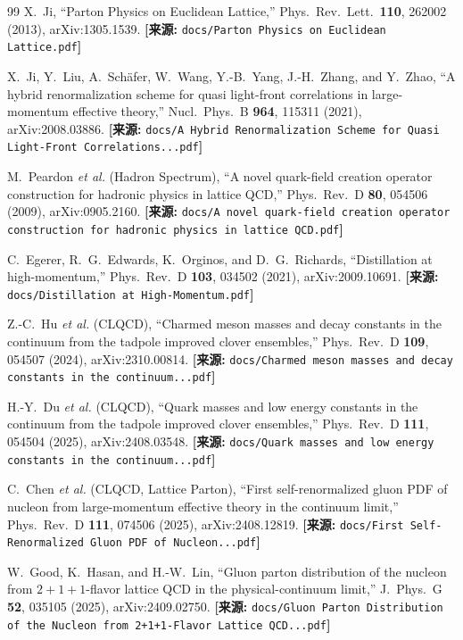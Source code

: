 \documentclass[12pt,a4paper]{ctexart}
\theoremstyle{definition}
\begin{document}
\begin{thebibliography}{99}
X.~Ji,
``Parton Physics on Euclidean Lattice,''
Phys.\ Rev.\ Lett.\ \textbf{110}, 262002 (2013), arXiv:1305.1539.
\quad\textbf{[来源:} \texttt{docs/Parton Physics on Euclidean Lattice.pdf}\textbf{]}

X.~Ji, Y.~Liu, A.~Sch\"afer, W.~Wang, Y.-B.~Yang, J.-H.~Zhang, and Y.~Zhao,
``A hybrid renormalization scheme for quasi light-front correlations in large-momentum effective theory,''
Nucl.\ Phys.\ B \textbf{964}, 115311 (2021), arXiv:2008.03886.
\quad\textbf{[来源:} \texttt{docs/A Hybrid Renormalization Scheme for Quasi Light-Front Correlations...pdf}\textbf{]}

M.~Peardon \textit{et al.} (Hadron Spectrum),
``A novel quark-field creation operator construction for hadronic physics in lattice QCD,''
Phys.\ Rev.\ D \textbf{80}, 054506 (2009), arXiv:0905.2160.
\quad\textbf{[来源:} \texttt{docs/A novel quark-field creation operator construction for hadronic physics in lattice QCD.pdf}\textbf{]}

C.~Egerer, R.~G.~Edwards, K.~Orginos, and D.~G.~Richards,
``Distillation at high-momentum,''
Phys.\ Rev.\ D \textbf{103}, 034502 (2021), arXiv:2009.10691.
\quad\textbf{[来源:} \texttt{docs/Distillation at High-Momentum.pdf}\textbf{]}

Z.-C.~Hu \textit{et al.} (CLQCD),
``Charmed meson masses and decay constants in the continuum from the tadpole improved clover ensembles,''
Phys.\ Rev.\ D \textbf{109}, 054507 (2024), arXiv:2310.00814.
\quad\textbf{[来源:} \texttt{docs/Charmed meson masses and decay constants in the continuum...pdf}\textbf{]}

H.-Y.~Du \textit{et al.} (CLQCD),
``Quark masses and low energy constants in the continuum from the tadpole improved clover ensembles,''
Phys.\ Rev.\ D \textbf{111}, 054504 (2025), arXiv:2408.03548.
\quad\textbf{[来源:} \texttt{docs/Quark masses and low energy constants in the continuum...pdf}\textbf{]}

C.~Chen \textit{et al.} (CLQCD, Lattice Parton),
``First self-renormalized gluon PDF of nucleon from large-momentum effective theory in the continuum limit,''
Phys.\ Rev.\ D \textbf{111}, 074506 (2025), arXiv:2408.12819.
\quad\textbf{[来源:} \texttt{docs/First Self-Renormalized Gluon PDF of Nucleon...pdf}\textbf{]}

W.~Good, K.~Hasan, and H.-W.~Lin,
``Gluon parton distribution of the nucleon from $2+1+1$-flavor lattice QCD in the physical-continuum limit,''
J.\ Phys.\ G \textbf{52}, 035105 (2025), arXiv:2409.02750.
\quad\textbf{[来源:} \texttt{docs/Gluon Parton Distribution of the Nucleon from 2+1+1-Flavor Lattice QCD...pdf}\textbf{]}


\end{thebibliography}
\end{document}
